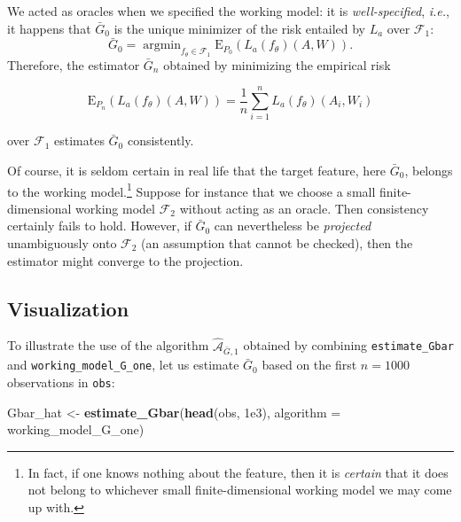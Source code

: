 \documentclass[11pt,openright,twoside]{book}
\newenvironment{Shaded}{\begin{snugshade}}{\end{snugshade}}
\newcommand{\DataTypeTok}[1]{\textcolor[rgb]{0.13,0.29,0.53}{#1}}
\newcommand{\FloatTok}[1]{\textcolor[rgb]{0.00,0.00,0.81}{#1}}
\newcommand{\KeywordTok}[1]{\textcolor[rgb]{0.13,0.29,0.53}{\textbf{#1}}}
\newcommand{\NormalTok}[1]{#1}
\newcommand{\StringTok}[1]{\textcolor[rgb]{0.31,0.60,0.02}{#1}}
\newcommand{\Algo}{\widehat{\mathcal{A}}}
\newcommand{\calF}{\mathcal{F}}
\newcommand{\Exp}{\textrm{E}}
\newcommand{\Gbar}{\bar{G}}
\theoremstyle{definition}
\theoremstyle{definition}
\theoremstyle{definition}
\theoremstyle{remark}
\begin{document}
We acted as oracles when we specified the working model: it is
\emph{well-specified}, \emph{i.e.}, it happens that \(\Gbar_{0}\) is the unique minimizer
of the risk entailed by \(L_{a}\) over \(\calF_{1}\): \begin{equation*}\Gbar_{0} =
\mathop{\arg\min}_{f_{\theta}        \in        \calF_{1}}        \Exp_{P_{0}}
\left(L_{a}(f_{\theta})(A,W)\right).\end{equation*} Therefore, the estimator
\(\Gbar_{n}\) obtained by minimizing the empirical risk

\begin{equation*}
\Exp_{P_{n}} \left(L_{a}(f_{\theta})(A,W)\right)  = \frac{1}{n} \sum_{i=1}^{n}
L_{a}(f_{\theta})(A_{i},W_{i})
\end{equation*}

over \(\calF_{1}\) estimates \(\Gbar_{0}\) consistently.

Of course, it is seldom certain in real life that the target feature, here
\(\Gbar_{0}\), belongs to the working model.\footnote{In fact, if one knows nothing
  about the feature, then it is \emph{certain} that it does not belong to whichever
  small finite-dimensional working model we may come up with.} Suppose for
instance that we choose a small finite-dimensional working model \(\calF_{2}\)
without acting as an oracle. Then consistency certainly fails to hold.
However, if \(\Gbar_{0}\) can nevertheless be \emph{projected} unambiguously onto
\(\calF_{2}\) (an assumption that cannot be checked), then the estimator might
converge to the projection.

\hypertarget{algo-Gbar-one}{%
\subsection{Visualization}\label{algo-Gbar-one}}

To illustrate the use of the algorithm \(\Algo_{\Gbar,1}\) obtained by combining
\texttt{estimate\_Gbar} and \texttt{working\_model\_G\_one}, let us estimate \(\Gbar_{0}\) based
on the first \(n = 1000\) observations in \texttt{obs}:

\begin{Shaded}
\begin{Highlighting}[]
\NormalTok{Gbar_hat <-}\StringTok{ }\KeywordTok{estimate_Gbar}\NormalTok{(}\KeywordTok{head}\NormalTok{(obs, }\FloatTok{1e3}\NormalTok{), }\DataTypeTok{algorithm =}\NormalTok{ working_model_G_one)}
\end{Highlighting}
\end{Shaded}
\end{document}

